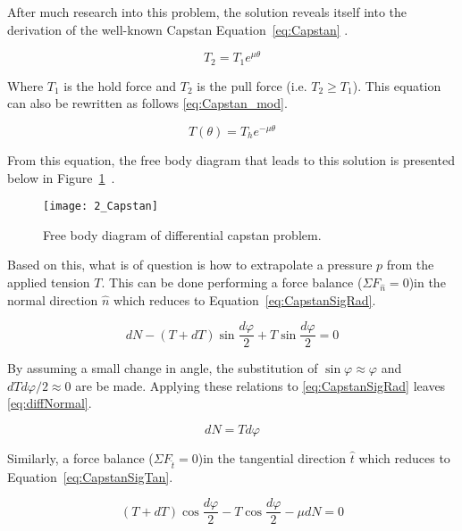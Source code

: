 After much research into this problem, the solution reveals itself into the derivation of the well-known Capstan Equation~\ref{eq:Capstan} \cite{capstanman}.

\begin{equation}
	\label{eq:Capstan}
	T_2 = T_1 e^{\mu\theta}
\end{equation}

Where $T_1$ is the hold force and $T_2$ is the pull force (i.e. $T_2 \geq T_1$). This equation can also be rewritten as follows \ref{eq:Capstan_mod}. 

\begin{equation}
	\label{eq:Capstan_mod}
	T(\theta) = T_h e^{-\mu\theta}
\end{equation}

From this equation, the free body diagram that leads to this solution is presented below in Figure~\ref{fig:Capstan}~\cite{capstanman}. 

\begin{figure}[H]
	\centering
	\texttt{[image: 2\_Capstan]}
	\caption[Free body diagram of differential capstan problem.]{Free body diagram of differential capstan problem. \protect\cite{capstanman}}
	\label{fig:Capstan}
\end{figure}

Based on this, what is of question is how to extrapolate a pressure $p$ from the applied tension $T$. This can be done performing a force balance ($\Sigma F_{\hat{n}} = 0 $)in the normal direction $\hat{n}$ which reduces to Equation~\ref{eq:CapstanSigRad}.

\begin{equation}
	\label{eq:CapstanSigRad}
	dN-(T+dT)\sin \frac{d\varphi}{2}+T\sin \frac{d\varphi}{2}= 0
\end{equation}

By assuming a small change in angle, the substitution of $\sin \varphi \approx \varphi$ and $dT d\varphi/2 \approx 0$ are be made. Applying these relations to \ref{eq:CapstanSigRad} leaves \ref{eq:diffNormal}.

\begin{equation}
	\label{eq:diffNormal}
	dN = T d\varphi
\end{equation}


Similarly, a force balance ($\Sigma F_{\hat{t}} = 0 $)in the tangential direction $\hat{t}$ which reduces to Equation~\ref{eq:CapstanSigTan}.

\begin{equation}
	\label{eq:CapstanSigTan}
	(T+dT)\cos \frac{d\varphi}{2}- T\cos \frac{d\varphi}{2} - \mu dN= 0
\end{equation}

